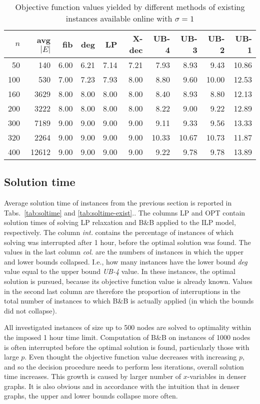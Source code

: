 \begin{table}[]
\centering
\begin{tabular}{rrrrrrrrrr}
$n$     &	avg $|E|$ & fib  & deg  & LP    & X-dec & UB-4  & UB-3  & UB-2  & UB-1  \\
\hline
  50 & 140  & 6.00 & 6.21 & 7.14 & 7.21 & 7.93 & 8.93  & 9.43  & 10.86 \\
 100 & 530  & 7.00 & 7.23 & 7.93 & 8.00 & 8.80 & 9.60  & 10.00 & 12.53 \\
 160 &3629  & 8.00 & 8.00 & 8.00 & 8.00 & 8.40 & 8.93  & 8.80  & 12.13 \\
 200 &3222  & 8.00 & 8.00 & 8.00 & 8.00 & 8.22 & 9.00  & 9.22  & 12.89 \\
 300 &7189  & 9.00 & 9.00 & 9.00 & 9.00 & 9.11 & 9.33  & 9.56  & 13.33 \\
 320 &2264  & 9.00 & 9.00 & 9.00 & 9.00 &10.33 &10.67  &10.73  & 11.87 \\
 400 &12612 & 9.00 & 9.00 & 9.00 & 9.00 & 9.22 & 9.78  & 9.78  & 13.89 \\
\end{tabular}
\caption{Objective function values yielded by different methods of existing instances available online with $\sigma=1$}
\label{tab:obj-exist}
\end{table}

\subsection{Solution time}

Average solution time of instances from the previous section is reported in Tabs.~\ref{tab:soltime} and \ref{tab:soltime-exist}..
The columns LP and OPT contain solution times of solving LP relaxation and B\&B applied to the ILP model, respectively.
The column \emph{int.} contains the percentage of instances of which solving was interrupted after 1 hour, before the optimal solution was found.
The values in the last column \emph{col.} are the numbers of instances in which the upper and lower bounds collapsed. 
I.e., how many instances have the lower bound \emph{deg} value equal to the upper bound \emph{UB-4} value.
In these instances, the optimal solution is pursued, because its objective function value is already known.
Values in the second last column are therefore the proportion of interruptions in the total number of instances to which B\&B is actually applied 
(in which the bounds did not collapse).

All investigated instances of size up to 500 nodes are solved to optimality within the imposed 1 hour time limit.
Computation of B\&B on instances of 1000 nodes is often interrupted before the optimal solution is found, particularly those with large $p$.
Even thought the objective function value decreases with increasing $p$, and so the decision procedure needs to perform less iterations, overall solution time increases.
This growth is caused by larger number of $x$-variables in denser graphs.
It is also obvious and in accordance with the intuition that in denser graphs, the upper and lower bounds collapse more often.

